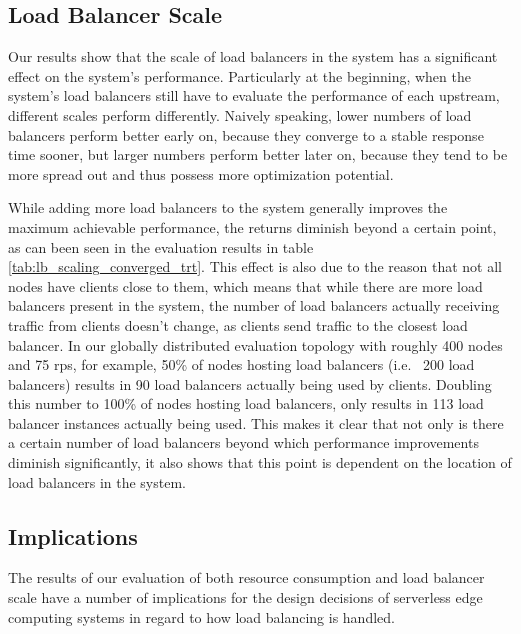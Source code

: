 \documentclass[draft,final]{vutinfth} %
\begin{document}
\subsection{Load Balancer Scale}
Our results show that the scale of load balancers in the system has a significant effect on the system's performance.
Particularly at the beginning, when the system's load balancers still have to evaluate the performance of each upstream, different scales perform differently.
Naively speaking, lower numbers of load balancers perform better early on, because they converge to a stable response time sooner, but larger numbers perform better later on, because they tend to be more spread out and thus possess more optimization potential.

While adding more load balancers to the system generally improves the maximum achievable performance, the returns diminish beyond a certain point, as can been seen in the evaluation results in table \ref{tab:lb_scaling_converged_trt}.
This effect is also due to the reason that not all nodes have clients close to them, which means that while there are more load balancers present in the system, the number of load balancers actually receiving traffic from clients doesn't change, as clients send traffic to the closest load balancer.
In our globally distributed evaluation topology with roughly 400 nodes and 75 \gls{rps}, for example, 50\% of nodes hosting load balancers (i.e. ~200 load balancers) results in 90 load balancers actually being used by clients. Doubling this number to 100\% of nodes hosting load balancers, only results in 113 load balancer instances actually being used.
This makes it clear that not only is there a certain number of load balancers beyond which performance improvements diminish significantly, it also shows that this point is dependent on the location of load balancers in the system.

\subsection{Implications}
The results of our evaluation of both resource consumption and load balancer scale have a number of implications for the design decisions of serverless edge computing systems in regard to how load balancing is handled.
\end{document}
